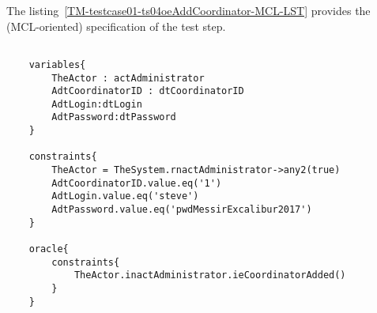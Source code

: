 	
	
		
	\vspace{1cm}
	The listing~\ref{TM-testcase01-ts04oeAddCoordinator-MCL-LST} provides the \msrmessir (MCL-oriented) specification of the test step.
	
	\scriptsize
	\vspace{0.5cm}
	\begin{lstlisting}[style=MessirStyle,firstnumber=auto,captionpos=b,caption={\msrmessir (MCL-oriented) specification of the test step \emph{testcase01-ts04oeAddCoordinator}.},label=TM-testcase01-ts04oeAddCoordinator-MCL-LST]

	variables{
		TheActor : actAdministrator
		AdtCoordinatorID : dtCoordinatorID
		AdtLogin:dtLogin
		AdtPassword:dtPassword
	}
	
	constraints{
		TheActor = TheSystem.rnactAdministrator->any2(true)
		AdtCoordinatorID.value.eq('1')
		AdtLogin.value.eq('steve')
		AdtPassword.value.eq('pwdMessirExcalibur2017')
	}
	
	oracle{
		constraints{
			TheActor.inactAdministrator.ieCoordinatorAdded()
		}
	}
	
	\end{lstlisting}
	\normalsize 
	
	
